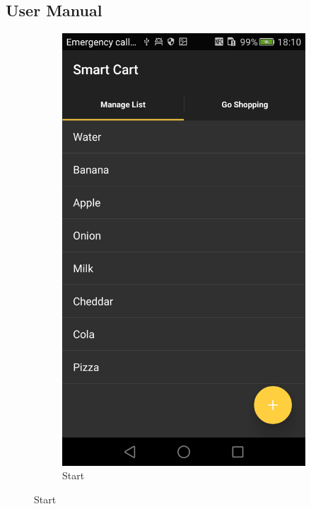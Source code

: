 \subsection{User Manual}


\begin{figure}[h]
\captionsetup{justification=centering}
\begin{subfigure}{0.475\textwidth} 
\centering 
\includegraphics[height= 0.35\textheight]{res/usermanual/startApp.png}
\caption{Start}
\label{fig:start}

\end{subfigure}
\end{figure}
